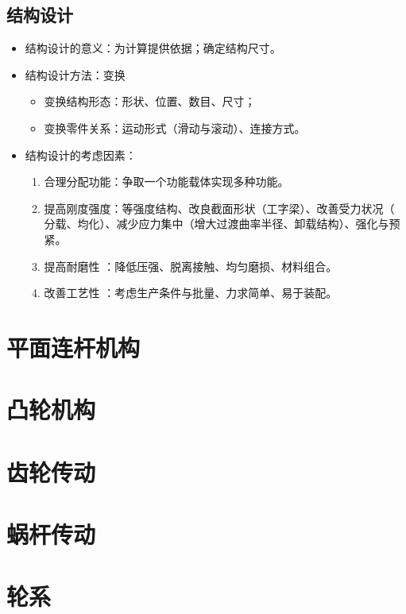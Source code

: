 \documentclass[12pt,a4paper]{article}
\newcommand{\tightlist}{\setlength{\parskip}{0pt}\setlength{\itemsep}{0pt}}
\newcommand{\hint}[1]{\textsf{（#1）}}
\newcommand{\minor}[1]{{\color{gray} #1}}
\begin{document}
\subsection{结构设计}
\begin{itemize}\tightlist
    \item 结构设计的意义：为计算提供依据；确定结构尺寸。
    \item 结构设计方法：变换
    \begin{itemize}\tightlist
        \item 变换结构形态：形状、位置、数目、尺寸；
        \item 变换零件关系：运动形式\hint{滑动与滚动}、连接方式。
    \end{itemize}
    \item 结构设计的考虑因素：
    \begin{enumerate}\tightlist
        \item \minor{合理分配功能：争取一个功能载体实现多种功能。}
        \item 提高刚度强度：等强度结构、改良截面形状\hint{工字梁}、改善受力状况\hint{
        分载、均化}、减少应力集中\hint{增大过渡曲率半径、卸载结构}、强化与预紧。
        \item 提高耐磨性\minor{：降低压强、脱离接触、均匀磨损、材料组合}。
        \item 改善工艺性\minor{：考虑生产条件与批量、力求简单、易于装配}。
    \end{enumerate}
\end{itemize}

\section{平面连杆机构}

\section{凸轮机构}

\section{齿轮传动}

\section{蜗杆传动}

\section{轮系}
\end{document}
